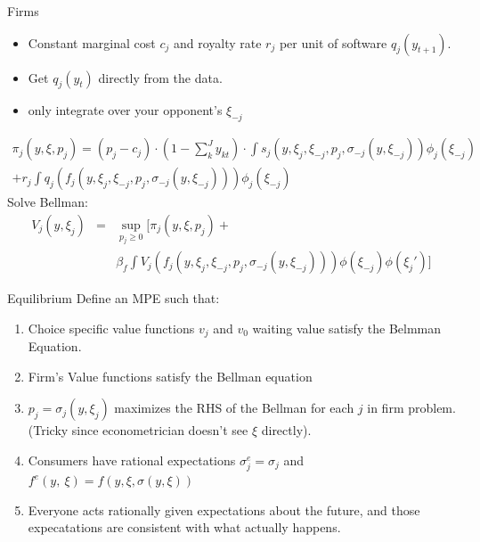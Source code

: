\begin{frame}{Firms}
\begin{itemize}
\item Constant marginal cost $c_j$ and royalty rate $r_j$ per unit of software $q_j(y_{t+1})$.
\item Get $q_j(y_t)$ directly from the data.
\item only integrate over your opponent's $\xi_{-j}$
\end{itemize}
\small
\begin{eqnarray*} \pi_j(y,\xi,p_j) = (p_j - c_j) \cdot (1-\sum_k^{J} y_{kt}) \cdot \int s_j(y,\xi_j,\xi_{-j},p_j,\sigma_{-j}(y,\xi_{-j})) \phi_j(\xi_{-j}) \\
+ r_j \int q_j(f_j(y,\xi_j,\xi_{-j},p_j,\sigma_{-j}(y,\xi_{-j}))) \phi_j(\xi_{-j})
\end{eqnarray*}
Solve Bellman:
\begin{eqnarray*} 
V_j(y,\xi_j) &=& \sup_{p_j \geq 0} [ \pi_j(y,\xi,p_j) +\\
 && \beta_f \int V_j(f_j(y,\xi_j,\xi_{-j},p_j,\sigma_{-j}(y,\xi_{-j}))) \phi(\xi_{-j}) \phi(\xi_j')]
\end{eqnarray*}


\end{frame}


\begin{frame}{Equilibrium}
Define an MPE such that:
\begin{enumerate}
\item Choice specific value functions $v_j$ and $v_0$ waiting value satisfy the Belmman Equation.
\item Firm's Value functions satisfy the Bellman equation
\item $p_j = \sigma_j(y,\xi_j)$ maximizes the RHS of the Bellman for each $j$ in firm problem. (Tricky since econometrician doesn't see $\xi$ directly).
\item Consumers have rational expectations $\sigma^e_j = \sigma_j$ and $f^e(y,\
\xi) = f(y,\xi,\sigma(y,\xi))$ 
\item Everyone acts rationally given expectations about the future, and those expecatations are consistent with what actually happens.
\end{enumerate}
\end{frame}



